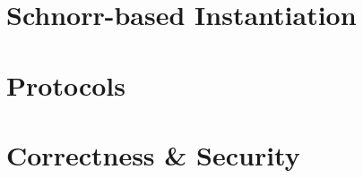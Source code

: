 \section{Schnorr-based Instantiation} \label{sec:sig:schnorr-inst}


\section{Protocols} \label{sec:sig:protocols}


\section{Correctness \& Security}\label{sec:sig:two-party-apt-security}


